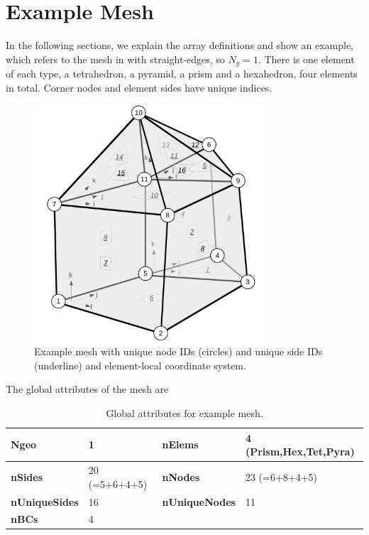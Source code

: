 \documentclass[a4paper,headsepline]{scrreprt}
\newcommand\rf[1]{\prettyref{#1}}
\newcommand\Ngeo{N_g}
\begin{document}
\section{Example Mesh}
In the following sections, we explain the array definitions and show an example, which refers to the mesh in \rf{fig:exmesh} with straight-edges, so $\Ngeo=1$. There is one element of each type, a tetrahedron, a pyramid, a prism and a hexahedron, four elements in total. Corner nodes and element sides have unique indices.
\begin{figure}[h!]
\centering
\includegraphics[width=0.78\textwidth]{pics/ex_allelem.pdf}
\caption{Example mesh with unique node IDs (circles) and unique side IDs (underline) and element-local coordinate system.}
\label{fig:exmesh}
\end{figure}

The global attributes of the mesh are  
\begin{table}[h!]
\centering
\begin{tabular}{|>{\bfseries\ttfamily}l|l||>{\bfseries\ttfamily}l|l|} \hline
Ngeo          & 1  
&nElems        & 4 (Prism,Hex,Tet,Pyra)\\\hline
nSides        & 20 (=5+6+4+5) 
&nNodes        & 23 (=6+8+4+5) \\\hline
nUniqueSides  & 16 
&nUniqueNodes  & 11 \\\hline
nBCs          & 4 & & \\\hline
\end{tabular}\caption{Global attributes for example mesh. }
\end{table}
\end{document}
